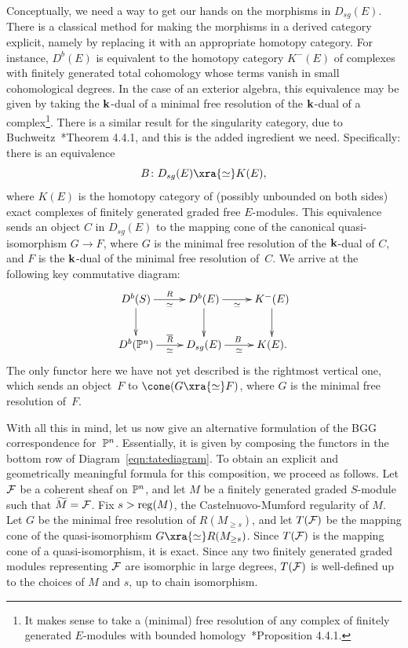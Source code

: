 \documentclass{amsart}
\begin{document}
Conceptually, we need a way to get our hands on the morphisms in $D_{sg}(E)$. There is a classical method for making the morphisms in a derived category explicit, namely by replacing it with an appropriate homotopy category. For instance, $D^b(E)$ is equivalent to the homotopy category $K^-(E)$ of complexes with finitely generated total cohomology whose terms vanish in small cohomological degrees. In the case of an exterior algebra, this equivalence may be given by taking the $\mathbf{k}$-dual of a minimal free resolution of the $\mathbf{k}$-dual of a complex\footnote{It makes sense to take a (minimal) free resolution of any complex of finitely generated $E$-modules with bounded homology~\cite{Roberts1998a}*{Proposition 4.4.1}.}. There is a similar result for the singularity category, due to Buchweitz~\cite{Buchweitz2021}*{Theorem 4.4.1}, and this is the added ingredient we need. Specifically: there is an equivalence
\begin{equation}
\label{eqn:buchweitz}
B \co D_{sg}(E) \xra{\simeq} K(E),
\end{equation}
where $K(E)$ is the homotopy category of (possibly unbounded on both sides) exact complexes of finitely generated graded free $E$-modules. This equivalence sends an object $C$ in $D_{sg}(E)$ to the mapping cone of the canonical quasi-isomorphism $G \to F$, where $G$ is the minimal free resolution of the $\mathbf{k}$-dual of $C$, and $F$ is the $\mathbf{k}$-dual of the minimal free resolution of~$C$. We arrive at the following key commutative diagram:
\begin{equation}
\label{eqn:tatediagram}
\xymatrix{
D^b(S) \ar[d] \ar[r]_-{\simeq}^-{R} & D^b(E) \ar[d] \ar[r]_-{\simeq} & K^-(E) \ar[d] \\
D^b(\PP^n) \ar[r]^-{\overline{R}}_-{\simeq} & D_{sg}(E) \ar[r]_-{\simeq}^B & K(E). \\
}
\end{equation}
The only functor here we have not yet described is the rightmost vertical one, which sends an object~$F$ to $\cone(G \xra{\simeq} F)$, where $G$ is the minimal free resolution of~$F$.

With all this in mind, let us now give an alternative formulation of the BGG correspondence for~$\mathbb P^n$. Essentially, it is given by composing the functors in the bottom row of Diagram~\eqref{eqn:tatediagram}. To obtain an explicit and geometrically meaningful formula for this composition, we proceed as follows. Let $\mathcal{F}$ be a coherent sheaf on $\mathbb P^n$, and let $M$ be a finitely generated graded $S$-module such that $\widetilde{M} = \mathcal{F}$. Fix $s > \operatorname{reg}(M)$, the Castelnuovo-Mumford regularity of $M$. Let $G$ be the minimal free resolution of $R(M_{\ge s})$, and let $T(\mathcal{F})$ be the mapping cone of the quasi-isomorphism $G \xra{\simeq} R(M_{\ge s})$. Since $T(\mathcal{F})$ is the mapping cone of a quasi-isomorphism, it is exact. Since any two finitely generated graded modules representing $\mathcal{F}$ are isomorphic in large degrees, $T(\mathcal{F})$ is well-defined up to the choices of $M$ and $s$, up to chain isomorphism.
\end{document}
